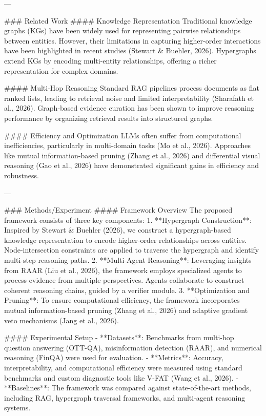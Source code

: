 ---

### Related Work
#### Knowledge Representation
Traditional knowledge graphs (KGs) have been widely used for representing pairwise relationships between entities. However, their limitations in capturing higher-order interactions have been highlighted in recent studies (Stewart & Buehler, 2026). Hypergraphs extend KGs by encoding multi-entity relationships, offering a richer representation for complex domains.

#### Multi-Hop Reasoning
Standard RAG pipelines process documents as flat ranked lists, leading to retrieval noise and limited interpretability (Sharafath et al., 2026). Graph-based evidence curation has been shown to improve reasoning performance by organizing retrieval results into structured graphs.

#### Efficiency and Optimization
LLMs often suffer from computational inefficiencies, particularly in multi-domain tasks (Mo et al., 2026). Approaches like mutual information-based pruning (Zhang et al., 2026) and differential visual reasoning (Gao et al., 2026) have demonstrated significant gains in efficiency and robustness.

---

### Methods/Experiment
#### Framework Overview
The proposed framework consists of three key components:
1. **Hypergraph Construction**: Inspired by Stewart & Buehler (2026), we construct a hypergraph-based knowledge representation to encode higher-order relationships across entities. Node-intersection constraints are applied to traverse the hypergraph and identify multi-step reasoning paths.
2. **Multi-Agent Reasoning**: Leveraging insights from RAAR (Liu et al., 2026), the framework employs specialized agents to process evidence from multiple perspectives. Agents collaborate to construct coherent reasoning chains, guided by a verifier module.
3. **Optimization and Pruning**: To ensure computational efficiency, the framework incorporates mutual information-based pruning (Zhang et al., 2026) and adaptive gradient veto mechanisms (Jang et al., 2026).

#### Experimental Setup
- **Datasets**: Benchmarks from multi-hop question answering (OTT-QA), misinformation detection (RAAR), and numerical reasoning (FinQA) were used for evaluation.
- **Metrics**: Accuracy, interpretability, and computational efficiency were measured using standard benchmarks and custom diagnostic tools like V-FAT (Wang et al., 2026).
- **Baselines**: The framework was compared against state-of-the-art methods, including RAG, hypergraph traversal frameworks, and multi-agent reasoning systems.

